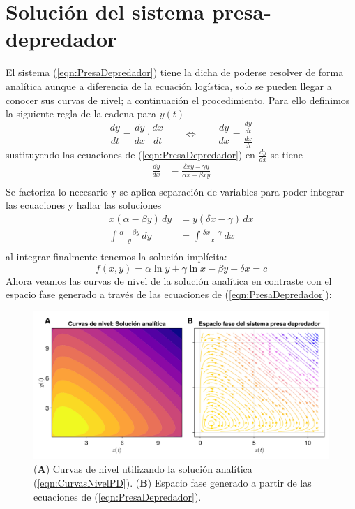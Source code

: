 \section{Solución del sistema presa-depredador}\label{sec:SolPresaDepredador}

El sistema (\ref{eqn:PresaDepredador}) tiene la dicha de poderse resolver de forma analítica aunque a diferencia de la ecuación logística, solo se pueden llegar a conocer sus curvas de nivel; a continuación el procedimiento. Para ello definimos la siguiente regla de la cadena para $y(t)$
$$\frac{dy}{dt} = \frac{dy}{dx}\cdot\frac{dx}{dt}\qquad\Longleftrightarrow\qquad\frac{dy}{dx}=\frac{\frac{dy}{dt}}{\frac{dx}{dt}}$$
sustituyendo las ecuaciones de (\ref{eqn:PresaDepredador}) en $\frac{dy}{dx}$ se tiene
\begin{align*}
	\frac{dy}{dx}&=\frac{\delta xy-\gamma y}{\alpha x-\beta xy}  \\
\end{align*}
Se factoriza lo necesario y se aplica separación de variables para poder integrar las ecuaciones y hallar las soluciones
\begin{align*}
	x(\alpha-\beta y)\, dy &= y(\delta x-\gamma)\, dx\\
	\int \frac{\alpha-\beta y}{y}\, dy &= \int \frac{\delta x-\gamma}{x}\, dx \\
\end{align*}
al integrar finalmente tenemos la solución implícita:
\begin{equation}\label{eqn:CurvasNivelPD}
	f(x,y)=\alpha\ln y+\gamma\ln x-\beta y- \delta x=c
\end{equation}
Ahora veamos las curvas de nivel de la solución analítica en contraste con el espacio fase generado a través de las ecuaciones de (\ref{eqn:PresaDepredador}):
\begin{figure}[h!]
	\centering
	\includegraphics[scale=0.22]{../Imagenes/Curvas de nivel PD}
	\caption{(\textbf{A}) Curvas de nivel utilizando la solución analítica (\ref{eqn:CurvasNivelPD}). (\textbf{B}) Espacio fase generado a partir de las ecuaciones de (\ref{eqn:PresaDepredador}).}
\end{figure}

